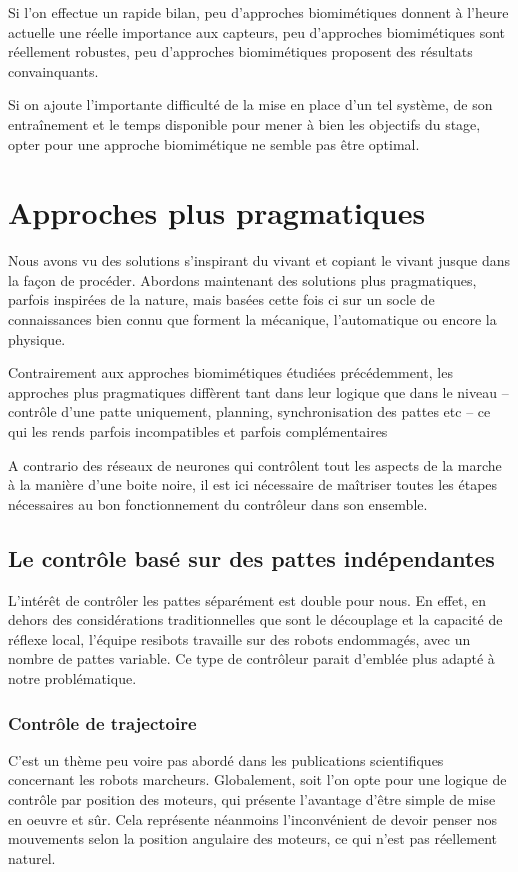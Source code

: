 \documentclass{tnreport}
\begin{document}
Si l'on effectue un rapide bilan, peu d'approches biomimétiques donnent à l'heure actuelle une réelle importance aux capteurs, peu d'approches biomimétiques sont réellement robustes, peu d'approches biomimétiques proposent des résultats convainquants. 

Si on ajoute l'importante difficulté de la mise en place d'un tel système, de son entraînement et le temps disponible pour mener à bien les objectifs du stage, opter pour une approche biomimétique ne semble pas être optimal.  

\newpage
\section{Approches plus pragmatiques}\label{lb:pratique}
Nous avons vu des solutions s'inspirant du vivant et copiant le vivant jusque dans la façon de procéder. Abordons maintenant des solutions plus pragmatiques, parfois inspirées de la nature, mais basées cette fois ci sur un socle de connaissances bien connu que forment la mécanique, l'automatique ou encore la physique.

Contrairement aux approches biomimétiques étudiées précédemment, les approches plus pragmatiques diffèrent tant dans leur logique que dans le niveau -- contrôle d'une patte uniquement, planning, synchronisation des pattes etc -- ce qui les rends parfois incompatibles et parfois complémentaires

A contrario des réseaux de neurones qui contrôlent tout les aspects de la marche à la manière d'une boite noire, il est ici nécessaire de maîtriser toutes les étapes nécessaires au bon fonctionnement du contrôleur dans son ensemble.
\subsection{Le contrôle basé sur des pattes indépendantes}
L'intérêt de contrôler les pattes séparément est double pour nous. En effet, en dehors des considérations traditionnelles que sont le découplage et la capacité de réflexe local, l'équipe resibots travaille sur des robots endommagés, avec un nombre de pattes variable. Ce type de contrôleur parait d'emblée plus adapté à notre problématique. 

\subsubsection{Contrôle de trajectoire}

C'est un thème peu voire pas abordé dans les publications scientifiques concernant les robots marcheurs. Globalement, soit l'on opte pour une logique de contrôle par position des moteurs, qui présente l'avantage d'être simple de mise en oeuvre et sûr. Cela représente néanmoins l'inconvénient de devoir penser nos mouvements selon la position angulaire des moteurs, ce qui n'est pas réellement naturel. 
\end{document}
